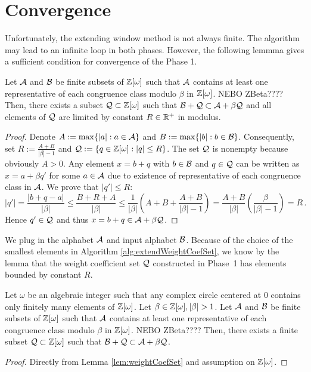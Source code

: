 \section{Convergence}
Unfortunately, the extending window method is not always finite. The algorithm may lead to an infinite loop in both phases. 
However, the following lemmma gives a sufficient condition for convergence of the Phase 1. 
\begin{lem}
\label{lem:weightCoefSet}
    Let $\mathcal{A}$ and $\mathcal{B}$ be finite subsets of $\mathbb{Z}[\omega]$ such that $\mathcal{A}$ contains at least one representative of each congruence class modulo $\beta$ in $\mathbb{Z}[\omega]$. NEBO ZBeta???? Then, there exists a subset $\mathcal{Q}\subset\mathbb{Z}[\omega]$ such that $ \mathcal{B} + \mathcal{Q} \subset \mathcal{A} + \beta \mathcal{Q}$ and all elements of $\mathcal{Q}$ are limited by constant $R\in \mathbb{R}^+$ in modulus.
\end{lem}
\begin{proof}
 Denote $A:=\max\{|a|:a \in \mathcal{A}\}$ and $B:=\max\{|b|:b\in\mathcal{B}\}$. Consequently, set $R:=\frac{A+B}{|\beta|-1}$ and $\mathcal{Q}:=\{q\in\mathbb{Z}[\omega]:|q|\leq R\}$. The set $\mathcal{Q}$ is nonempty because obviously $A>0$. Any element $x=b+q$ with $b\in\mathcal{B}$ and $q\in\mathcal{Q}$ can be written as $x=a+\beta q'$ for some $a\in\mathcal{A}$ due to existence of representative of each congruence class in $\mathcal{A}$. We prove that $|q'|\leq R$:
 $$
    |q'|=\frac{|b+q-a|}{|\beta|}\leq \frac{B+R+A}{|\beta|} \leq \frac{1}{|\beta|}\left(A+B+\frac{A+B}{|\beta|-1}\right)  =\frac{A+B}{|\beta|}\left(\frac{\beta}{|\beta|-1}\right)=R\,.
 $$ 
 Hence $q'\in\mathcal{Q}$ and thus  $x=b+q \in \mathcal{A} + \beta \mathcal{Q}$.
\end{proof}
We plug in the alphabet $\mathcal{A}$ and input alphabet $\mathcal{B}$. Because of the choice of the smallest elements in Algorithm \ref{alg:extendWeightCoefSet}, we know by the lemma that the weight coefficient set $\mathcal{Q}$ constructed in Phase~1 has elements bounded by constant $R$. 
\begin{theo}
    Let $\omega$ be an algebraic integer such that any complex circle centered at 0 contains only finitely  many elements of $\mathbb{Z}[\omega]$. Let $\beta \in \Zomega, |\beta|>1$. Let $\mathcal{A}$ and $\mathcal{B}$ be finite subsets of $\mathbb{Z}[\omega]$ such that $\mathcal{A}$ contains at least one representative of each congruence class modulo $\beta$ in $\mathbb{Z}[\omega]$. NEBO ZBeta???? Then, there exists a finite subset $\mathcal{Q}\subset\mathbb{Z}[\omega]$ such that $ \mathcal{B} + \mathcal{Q} \subset \mathcal{A} + \beta \mathcal{Q}$.
\end{theo} 
\begin{proof}
    Directly from Lemma \ref{lem:weightCoefSet} and assumption on $\mathbb{Z}[\omega]$.
\end{proof}
